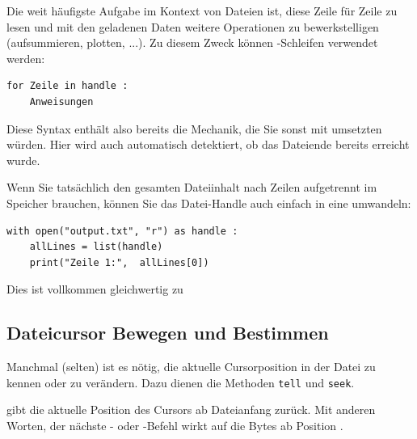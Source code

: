 Die weit häufigste Aufgabe im Kontext von Dateien ist, diese Zeile für Zeile zu lesen und mit den geladenen Daten weitere Operationen zu bewerkstelligen (\eg aufsummieren, plotten, ...). Zu diesem Zweck können -Schleifen verwendet werden:

\begin{codebox}
\begin{verbatim}
for Zeile in handle :
    Anweisungen
\end{verbatim}
\end{codebox}

Diese Syntax enthält also bereits die Mechanik, die Sie sonst mit  umsetzten würden. Hier wird auch automatisch detektiert, ob das Dateiende bereits erreicht wurde.

Wenn Sie tatsächlich den gesamten Dateiinhalt nach Zeilen aufgetrennt im Speicher brauchen, können Sie das Datei-Handle auch einfach in eine  umwandeln:

\begin{codebox}
\begin{verbatim}
with open("output.txt", "r") as handle :
    allLines = list(handle)
    print("Zeile 1:",  allLines[0])
\end{verbatim}
\end{codebox}

Dies ist vollkommen gleichwertig zu 

\subsection{Dateicursor Bewegen und Bestimmen}
Manchmal (selten) ist es nötig, die aktuelle Cursorposition in der Datei zu kennen oder zu verändern. Dazu dienen die Methoden \texttt{tell} und \texttt{seek}.

 gibt die aktuelle Position des Cursors ab Dateianfang zurück. Mit anderen Worten, der nächste - oder -Befehl wirkt auf die Bytes ab Position .


